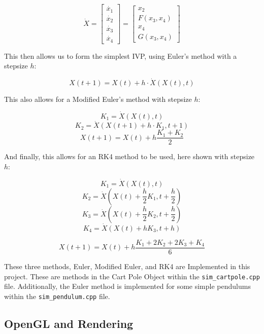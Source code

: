 \documentclass[12pt]{article}
\begin{document}
\[
\dot{X} =
\begin{bmatrix}
\dot{x_1} \\
\dot{x_2} \\
\dot{x_3} \\
\dot{x_4}
\end{bmatrix}
=
\begin{bmatrix}
x_2 \\
F(x_3, x_4) \\
x_4 \\
G(x_3, x_4)
\end{bmatrix}
\]

This then allows us to form the simplest IVP, using Euler's method with a stepsize $h$:

\begin{equation} \label{eq:9}
X(t+1) = X(t) + h \cdot \dot{X}(X(t),t)
\end{equation}

This also allows for a Modified Euler's method with stepsize $h$:

\[
K_1 = \dot{X}(X(t),t)
\]
\[
K_2 = \dot{X}(X(t+1) + h \cdot K_1,t+1)
\]
\begin{equation} \label{eq:10}
X(t+1) = X(t) + h \frac{K_1 + K_2}{2}
\end{equation}

And finally, this allows for an RK4 method to be used, here shown with stepsize $h$:

\[
K_1 = \dot{X}(X(t),t)
\]
\[
K_2 = \dot{X}(X(t)+ \frac{h}{2} K_1,t + \frac{h}{2})
\]
\[
K_3 = \dot{X}(X(t)+ \frac{h}{2} K_2,t + \frac{h}{2})
\]
\[
K_4 = \dot{X}(X(t)+ h K_3,t + h)
\]

\begin{equation} \label{eq:10}
X(t+1) = X(t) + h \frac{K_1 + 2K_2 + 2K_3 + K_4}{6}
\end{equation}

These three methods, Euler, Modified Euler, and RK4 are Implemented in this project. These are
methods in the Cart Pole Object within the \texttt{sim\_cartpole.cpp} file. Additionally,
the Euler method is implemented for some simple pendulums within the \texttt{sim\_pendulum.cpp}
file.

\subsection{OpenGL and Rendering}
\end{document}
